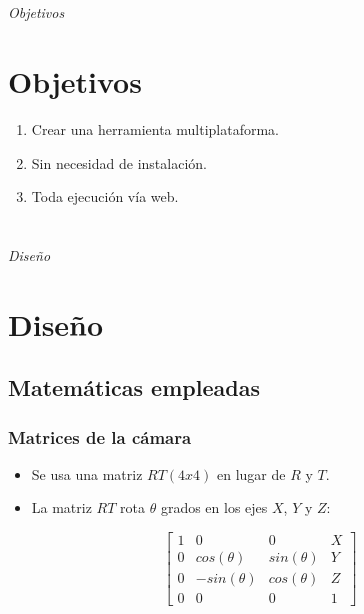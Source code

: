 \documentclass{beamer}
\begin{document}
\section*{}
\begin{frame}{}
  \centering \Huge
  \emph{Objetivos}
\end{frame}

\section{Objetivos}
\begin{frame}
\begin{enumerate}
\item Crear una herramienta multiplataforma.
\item Sin necesidad de instalación.
\item Toda ejecución vía web.
\end{enumerate}
\end{frame}

\section*{}
\begin{frame}{}
  \centering \Huge
  \emph{Diseño}
\end{frame}

\section{Diseño}
\subsection{Matemáticas empleadas}
\begin{frame}
\frametitle{Matrices de la cámara}
\begin{itemize}
\item Se usa una matriz $RT (4x4)$ en lugar de $R$ y $T$.
\item La matriz $RT$ rota $\theta$ grados en los ejes $X$, $Y$ y $Z$:
\end{itemize}
\begin{equation}
	\begin{bmatrix}
	1 & 0 & 0 & X \\
	0 & cos(\theta) & sin(\theta) &	Y \\
	0 & -sin(\theta)& cos(\theta) & Z \\
	0 & 0 & 0 & 1 
	\end{bmatrix}
\end{equation}
\end{frame}
\end{document}
